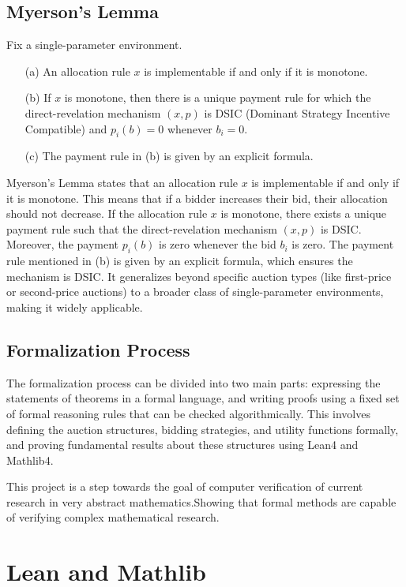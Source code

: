 \subsection{Myerson's Lemma}
\begin{lemma}
Fix a single-parameter environment.
\begin{enumerate}
    \item[(a)] An allocation rule \(x\) is implementable if and only if it is monotone.
    \item[(b)] If \(x\) is monotone, then there is a unique payment rule for which the direct-revelation mechanism \((x, p)\) is DSIC (Dominant Strategy Incentive Compatible) and \(p_i(b) = 0\) whenever \(b_i = 0\).
    \item[(c)] The payment rule in (b) is given by an explicit formula.
\end{enumerate}
\end{lemma}
Myerson's Lemma states that 
an allocation rule \(x\) is implementable if and only if it is monotone. This means that if a bidder increases their bid, their allocation should not decrease. If the allocation rule \(x\) is monotone, there exists a unique payment rule such that the direct-revelation mechanism \((x, p)\) is DSIC. Moreover, the payment \(p_i(b)\) is zero whenever the bid \(b_i\) is zero. The payment rule mentioned in (b) is given by an explicit formula, which ensures the mechanism is DSIC. It generalizes beyond specific auction types (like first-price or second-price auctions) to a broader class of single-parameter environments, making it widely applicable.
\subsection{Formalization Process}
The formalization process can be divided into two main parts: expressing the statements of theorems in a formal language, and writing proofs using a fixed set of formal reasoning rules that can be checked algorithmically. This involves defining the auction structures, bidding strategies, and utility functions formally, and proving fundamental results about these structures using Lean4 and Mathlib4. 


This project is a step towards the goal of computer verification of current research in very abstract mathematics.Showing that formal methods are capable of verifying complex mathematical research.

\section{Lean and Mathlib}

